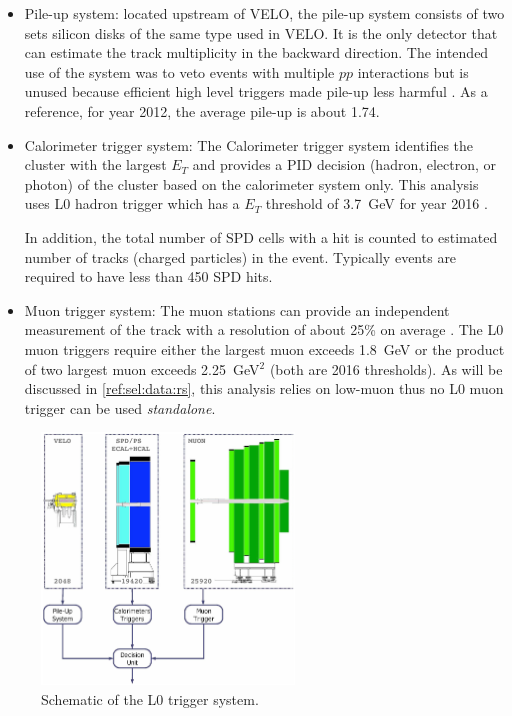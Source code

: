 \begin{itemize}
    \item Pile-up system:
        located upstream of VELO, the pile-up system consists of two sets
        silicon disks of the same type used in VELO.
        It is the only detector that can estimate the track multiplicity
        in the backward direction.
        The intended use of the system was to veto events with multiple $pp$
        interactions but is unused because efficient high level triggers
        made pile-up less harmful \cite{Oggero:1635658}.
        As a reference, for year 2012, the average pile-up is about 1.74.

    \item Calorimeter trigger system:
        The Calorimeter trigger system identifies the cluster with the largest
        $E_T$ and provides a PID decision (hadron, electron, or photon) of the
        cluster based on the calorimeter system only.
        This analysis uses L0 hadron trigger which has a $E_T$ threshold
        of 3.7~GeV for year 2016 \cite{LHCb-DP-2019-001}.

        In addition, the total number of SPD cells with a hit is counted to
        estimated number of tracks (charged particles) in the event.
        Typically events are required to have less than 450 SPD hits.

    \item Muon trigger system:
        The muon stations can provide an independent measurement of the track
        \pt with a resolution of about 25\% on average
        \cite{LHCb-DP-2019-001}.
        The L0 muon triggers require either the largest muon \pt exceeds
        1.8~GeV or the product of two largest muon \pt exceeds 2.25~GeV$^2$
        (both are 2016 thresholds).
        As will be discussed in \cref{ref:sel:data:rs},
        this analysis relies on low-\pt muon thus no L0 muon trigger can be
        used \emph{standalone}.
\end{itemize}

\begin{figure}[!htb]
    \centering
    \includegraphics[width=0.6\textwidth]{./figs-detector/trigger/l0_system_schematic.pdf}
    \caption{
        Schematic of the L0 trigger system.
    }
    \label{fig:l0-schematic}
\end{figure}
